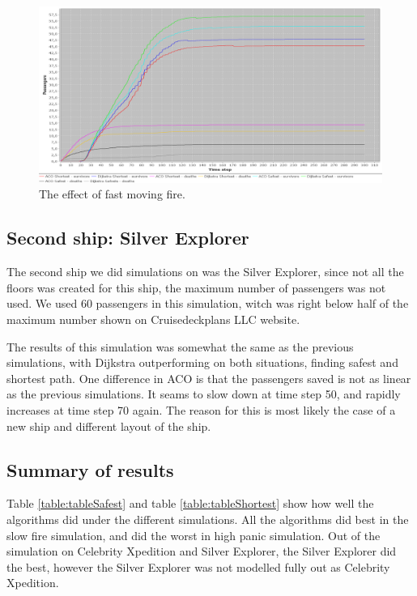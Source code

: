\begin{figure} [h]
\centering
\hspace*{-1.0in}
\includegraphics[scale=0.35]{images/Graph-ship-two-60-passangers-200-rounds.png}
\caption{The effect of fast moving fire.}
\label{fig:silverExplor}
\end{figure}

\subsection{Second ship: Silver Explorer}
The second ship we did simulations on was the Silver Explorer, since not all the floors was created for this ship, the maximum number of passengers was not used. We used 60 passengers in this simulation, witch was right below half of the maximum number shown on Cruisedeckplans LLC website\cite{cruseships}.

The results of this simulation was somewhat the same as the previous simulations, with Dijkstra outperforming on both situations, finding safest and shortest path. One difference in ACO is that the passengers saved is not as linear as the previous simulations. It seams to slow down at time step 50, and rapidly increases at time step 70 again. The reason for this is most likely the case of a new ship and different layout of the ship.

\subsection{Summary of results}

Table \ref{table:tableSafest} and table \ref{table:tableShortest} show how well the algorithms did under the different simulations. All the algorithms did best in the slow fire simulation, and did the worst in high panic simulation. Out of the simulation on Celebrity Xpedition and Silver Explorer, the Silver Explorer did the best, however the Silver Explorer was not modelled fully out as Celebrity Xpedition.

